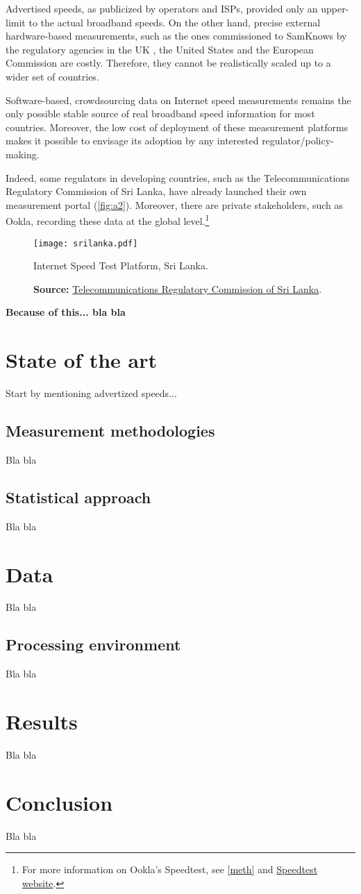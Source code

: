 \documentclass[12pt]{article}
\begin{document}
Advertised speeds, as publicized by operators and ISPs, provided only an upper-limit to the actual broadband speeds. On the other hand, precise external hardware-based measurements, such as the ones commissioned to SamKnows by the regulatory agencies in the UK \citep{ofcom2017}, the United States \citep{fcc2015b} and the European Commission \citep{samknows2013} are costly. Therefore, they cannot be realistically scaled up to a wider set of countries.  

Software-based, crowdsourcing data on Internet speed measurements remains the only possible stable source of real broadband speed information for most countries. Moreover, the low cost of deployment of these measurement platforms makes it possible to envisage its adoption by any interested regulator/policy-making. 

Indeed, some regulators in developing countries, such as the Telecommunications Regulatory Commission of Sri Lanka, have already launched their own measurement portal (\autoref{fig:a2}). Moreover, there are private stakeholders, such as Ookla, recording these data at the global level.\footnote{For more information on Ookla's Speedtest, see \autoref{meth} and \href{http://beta.speedtest.net/about}{Speedtest website}.} 

\begin{figure}[H]
    \centering
        \texttt{[image: srilanka.pdf]}
        \caption{Internet Speed Test Platform,  Sri Lanka.}
        \caption*{\textbf{Source:} \href{http://www.trc.gov.lk/2014-05-12-13-25-54/internet-speed-test.html}{Telecommunications Regulatory Commission of Sri Lanka}.}
        \label{fig:a2}
\end{figure}   

\textbf{Because of this... bla bla}

\section{State of the art}
Start by mentioning advertized speeds...
\subsection{Measurement methodologies} \label{meth}
Bla bla
\subsection{Statistical approach}
Bla bla
\section{Data}
Bla bla
\subsection{Processing environment}
Bla bla
\section{Results}
Bla bla
\section{Conclusion}
Bla bla

\nocite{*}



\end{document}
